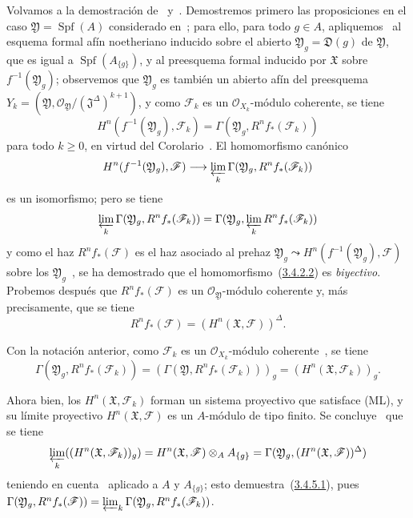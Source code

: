 \begin{env}[3.4.5]
\label{III.3.4.5}
\label{III.3.4.5-fr}
Volvamos a la demostración de~ y~.
Demostremos primero las proposiciones en el caso $\mathfrak Y=\operatorname{Spf}(A)$ considerado en~; para ello, para todo $g\in A$, apliquemos~ al esquema formal afín noetheriano inducido sobre el abierto $\mathfrak Y_g=\mathfrak D(g)$ de $\mathfrak Y$, que es igual a $\operatorname{Spf}(A_{\{g\}})$, y al preesquema formal inducido por $\mathfrak X$ sobre $f^{-1}(\mathfrak Y_g)$; observemos que $\mathfrak Y_g$ es también un abierto afín del preesquema $Y_k=(\mathfrak Y,\mathcal O_{\mathfrak Y}/(\mathfrak J^\Delta)^{k+1})$, y como $\mathcal F_k$ es un $\mathcal O_{X_k}$-módulo coherente, se tiene
\[
H^n(f^{-1}(\mathfrak Y_g),\mathcal F_k)
=\Gamma(\mathfrak Y_g,R^nf_*(\mathcal F_k))
\]
para todo $k\geq0$, en virtud del Corolario~.
El homomorfismo canónico
\[
H^n(f^{-1}(\mathfrak Y_g),\mathcal F)
\longrightarrow\varprojlim_k\Gamma(\mathfrak Y_g,R^nf_*(\mathcal F_k))
\]
es un isomorfismo; pero se tiene~
\[
\varprojlim_k\Gamma(\mathfrak Y_g,R^nf_*(\mathcal F_k))
=\Gamma(\mathfrak Y_g,\varprojlim_kR^nf_*(\mathcal F_k))
\]
y como el haz $R^nf_*(\mathcal F)$ es el haz asociado al prehaz $\mathfrak Y_g\leadsto H^n(f^{-1}(\mathfrak Y_g),\mathcal F)$ sobre los $\mathfrak Y_g$~, se ha demostrado que el homomorfismo~(\hyperref[III.3.4.2.2]{3.4.2.2}) es \emph{biyectivo}.
Probemos después que $R^nf_*(\mathcal F)$ es un $\mathcal O_{\mathfrak Y}$-módulo coherente y, más precisamente, que se tiene
\[
R^nf_*(\mathcal F)=(H^n(\mathfrak X,\mathcal F))^\Delta.
\tag{3.4.5.1}\label{III.3.4.5.1-fr}
\]

Con la notación anterior, como $\mathcal F_k$ es un $\mathcal O_{X_k}$-módulo coherente~, se tiene
\[
\Gamma(\mathfrak Y_g,R^nf_*(\mathcal F_k))
=(\Gamma(\mathfrak Y,R^nf_*(\mathcal F_k)))_g
=(H^n(\mathfrak X,\mathcal F_k))_g.
\]

Ahora bien, los $H^n(\mathfrak X,\mathcal F_k)$ forman un sistema proyectivo que satisface (ML), y su límite proyectivo $H^n(\mathfrak X,\mathcal F)$ es un $A$-módulo de tipo finito.
Se concluye~ que se tiene
\[
\varprojlim_k((H^n(\mathfrak X,\mathcal F_k))_g)
=H^n(\mathfrak X,\mathcal F)\otimes_AA_{\{g\}}
=\Gamma(\mathfrak Y_g,(H^n(\mathfrak X,\mathcal F))^\Delta)
\]
teniendo en cuenta~ aplicado a $A$ y $A_{\{g\}}$; esto demuestra~(\hyperref[III.3.4.5.1]{3.4.5.1}), pues $\Gamma(\mathfrak Y_g,R^nf_*(\mathcal F))
=\varprojlim_k\Gamma(\mathfrak Y_g,R^nf_*(\mathcal F_k))$.


\end{env}
